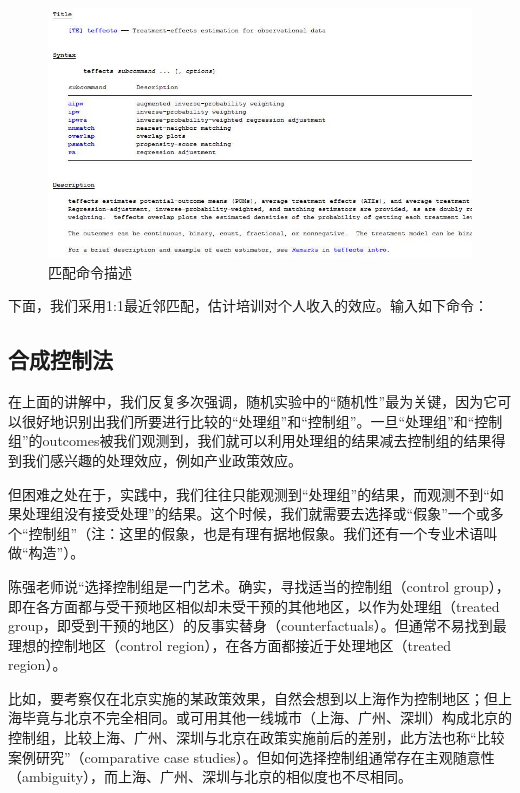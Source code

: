 \documentclass[cn,12pt,math=newtx,citestyle=gb7714-2015,bibstyle=gb7714-2015]{elegantbook}
\begin{document}
	\begin{figure}[htbp]
		\centering
		\includegraphics[width=1\textwidth]{teffects.jpg}
		\caption{匹配命令描述}\label{fig:digit}
	\end{figure}
	
	下面，我们采用1:1最近邻匹配，估计培训对个人收入的效应。输入如下命令：
	
	
	
	
	\subsection{合成控制法}
	在上面的讲解中，我们反复多次强调，随机实验中的“随机性”最为关键，因为它可以很好地识别出我们所要进行比较的“处理组”和“控制组”。一旦“处理组”和“控制组”的outcomes被我们观测到，我们就可以利用处理组的结果减去控制组的结果得到我们感兴趣的处理效应，例如产业政策效应。
	
	但困难之处在于，实践中，我们往往只能观测到“处理组”的结果，而观测不到“如果处理组没有接受处理”的结果。这个时候，我们就需要去选择或“假象”一个或多个“控制组”（注：这里的假象，也是有理有据地假象。我们还有一个专业术语叫做“构造”）。
	
	陈强老师说“选择控制组是一门艺术。确实，寻找适当的控制组（control group），即在各方面都与受干预地区相似却未受干预的其他地区，以作为处理组（treated group，即受到干预的地区）的反事实替身（counterfactuals）。但通常不易找到最理想的控制地区（control region），在各方面都接近于处理地区（treated region）。
	
	比如，要考察仅在北京实施的某政策效果，自然会想到以上海作为控制地区；但上海毕竟与北京不完全相同。或可用其他一线城市（上海、广州、深圳）构成北京的控制组，比较上海、广州、深圳与北京在政策实施前后的差别，此方法也称“比较案例研究”（comparative case studies）。但如何选择控制组通常存在主观随意性（ambiguity），而上海、广州、深圳与北京的相似度也不尽相同。
	
\end{document}
